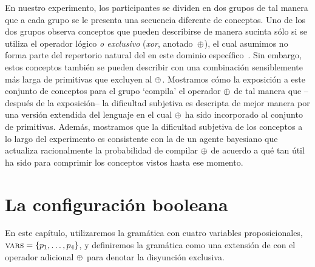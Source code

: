 En nuestro experimento, los participantes se dividen en dos grupos de tal manera que a cada grupo se le presenta una secuencia diferente de conceptos. Uno de los dos grupos observa conceptos que pueden describirse de manera sucinta sólo si se utiliza el operador lógico {\em o exclusivo} ({\em xor}, anotado~$\oplus$), el cual asumimos no forma parte del repertorio natural del \lot en este dominio específico~\cite{piantadosi2016logical}. Sin embargo, estos conceptos también se pueden describir con una combinación sensiblemente más larga de primitivas que excluyen al $\oplus$. Mostramos cómo la exposición a este conjunto de conceptos para el grupo `compila' el operador $\oplus$ de tal manera que --después de la exposición-- la dificultad subjetiva es descripta de mejor manera por una versión extendida del lenguaje en el cual $\oplus$ ha sido incorporado al conjunto de primitivas. Además, mostramos que la dificultad subjetiva de los conceptos a lo largo del experimento es consistente con la de un agente bayesiano que actualiza racionalmente la probabilidad de compilar $\oplus$ de acuerdo a qué tan útil ha sido para comprimir los conceptos vistos hasta ese momento.

\section{La configuración booleana}

En este capítulo, utilizaremos la gramática \grambool con cuatro variables proposicionales, $\textsc{vars}=\{p_1,\dots,p_4\}$, y definiremos la gramática \gramboolxor como una extensión de \grambool con el operador adicional $\oplus$ para denotar la disyunción exclusiva.

